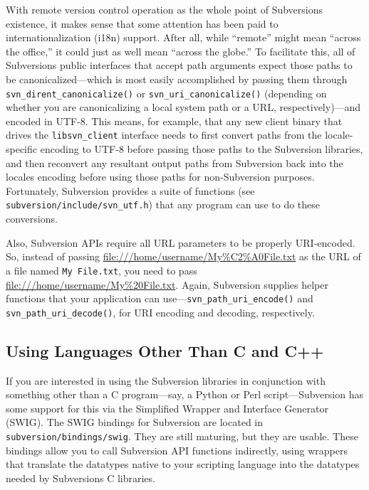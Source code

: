 With remote version control operation as the whole point of
Subversion\textquotesingle s existence, it makes sense that some
attention has been paid to internationalization (i18n) support. After
all, while ``remote'' might mean ``across the office,'' it could just as
well mean ``across the globe.'' To facilitate this, all of
Subversion\textquotesingle s public interfaces that accept path
arguments expect those paths to be canonicalized---which is most easily
accomplished by passing them through
\texttt{svn\_dirent\_canonicalize()} or
\texttt{svn\_uri\_canonicalize()} (depending on whether you are
canonicalizing a local system path or a URL, respectively)---and encoded
in UTF-8. This means, for example, that any new client binary that
drives the \texttt{libsvn\_client} interface needs to first convert
paths from the locale-specific encoding to UTF-8 before passing those
paths to the Subversion libraries, and then reconvert any resultant
output paths from Subversion back into the locale\textquotesingle s
encoding before using those paths for non-Subversion purposes.
Fortunately, Subversion provides a suite of functions (see
\texttt{subversion/include/svn\_utf.h}) that any program can use to do
these conversions.

Also, Subversion APIs require all URL parameters to be properly
URI-encoded. So, instead of passing
\url{file:///home/username/My\%C2\%A0File.txt} as the URL of a file
named \texttt{My\ File.txt}, you need to pass
\url{file:///home/username/My\%20File.txt}. Again, Subversion supplies
helper functions that your application can
use---\texttt{svn\_path\_uri\_encode()} and
\texttt{svn\_path\_uri\_decode()}, for URI encoding and decoding,
respectively.

\subsection{Using Languages Other Than C and
C++}\label{svn.developer.usingapi.otherlangs}

If you are interested in using the Subversion libraries in conjunction
with something other than a C program---say, a Python or Perl
script---Subversion has some support for this via the Simplified Wrapper
and Interface Generator (SWIG). The SWIG bindings for Subversion are
located in \texttt{subversion/bindings/swig}. They are still maturing,
but they are usable. These bindings allow you to call Subversion API
functions indirectly, using wrappers that translate the datatypes native
to your scripting language into the datatypes needed by
Subversion\textquotesingle s C libraries.

